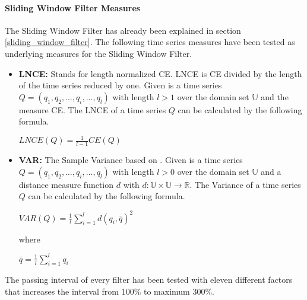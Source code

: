 \paragraph{Sliding Window Filter Measures} \label{sliding_window_filter_measures}
The Sliding Window Filter has already been explained in section \ref{sliding_window_filter}. The following time series
measures have been tested as underlying measures for the Sliding Window Filter.

\begin{itemize}
    \item \textbf{LNCE:} Stands for length normalized CE. LNCE is CE divided by the length of the time series reduced by
    one. Given is a time series $Q = (q_1, q_2, \dots, q_i, \dots, q_l)$ with length $l > 1$ over the domain set
    $\mathbb{U}$ and the measure CE. The LNCE of a time series $Q$ can be calculated by the following formula.
    \begin{center}
        $LNCE(Q) = \frac{1}{l - 1}CE(Q)$
    \end{center}
    \item \textbf{VAR:} The Sample Variance based on \cite{chan1983algorithms}. Given is a time series
    $Q = (q_1, q_2, \dots, q_i, \dots, q_l)$ with length $l > 0$ over the domain set $\mathbb{U}$ and a distance measure
    function $d$ with $d: \mathbb{U} \times \mathbb{U} \to \mathbb{R}$. The Variance of a time series $Q$ can be
    calculated by the following formula.
    \begin{center}
        $VAR(Q) = \frac{1}{l}\sum \limits_{i=1}^{l} d(q_i, \bar{q})^2$
    \end{center}
    where
    \begin{center}
        $\bar{q} = \frac{1}{l} \sum \limits_{i=1}^{l} q_i$
    \end{center}
\end{itemize}
The passing interval of every filter has been tested with eleven different factors that increases the interval from
100\% to maximum 300\%.
